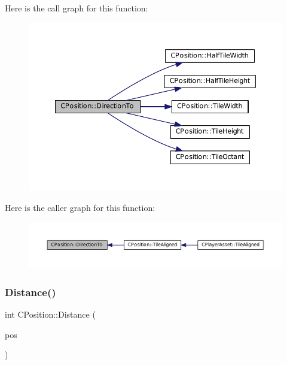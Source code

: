 Here is the call graph for this function\+:\nopagebreak
\begin{figure}[H]
\begin{center}
\leavevmode
\includegraphics[width=350pt]{classCPosition_a65124e3543c2d2e284e5eb517cd7f842_cgraph}
\end{center}
\end{figure}
Here is the caller graph for this function\+:\nopagebreak
\begin{figure}[H]
\begin{center}
\leavevmode
\includegraphics[width=350pt]{classCPosition_a65124e3543c2d2e284e5eb517cd7f842_icgraph}
\end{center}
\end{figure}
\hypertarget{classCPosition_a9edc6690c78a54ea08b137df83c22e91}{}\label{classCPosition_a9edc6690c78a54ea08b137df83c22e91} 
\subsubsection{\texorpdfstring{Distance()}{Distance()}}
{\footnotesize\ttfamily int C\+Position\+::\+Distance (\begin{DoxyParamCaption}\item[{const \hyperlink{classCPosition}{C\+Position} \&}]{pos }\end{DoxyParamCaption})}



